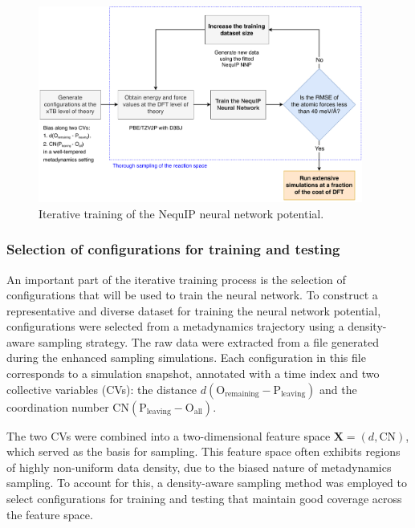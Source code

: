 \begin{figure}[t]
    \centering
    \includegraphics[width=0.95\textwidth]{Figures/3_Computational_details/workflow_diagram_updated.pdf}
    \caption{Iterative training of the NequIP neural network potential.}
    \label{fig:iterative-training}
\end{figure}



\subsubsection{Selection of configurations for training and testing}

An important part of the iterative training process is the selection of configurations that will be used to train the neural network. To construct a representative and diverse dataset for training the neural network potential, configurations were selected from a metadynamics trajectory using a density-aware sampling strategy. The raw data were extracted from a file generated during the enhanced sampling simulations. Each configuration in this file corresponds to a simulation snapshot, annotated with a time index and two collective variables (CVs): the distance $d(\mathrm{O}_\text{remaining} - \mathrm{P}_\text{leaving})$ and the coordination number $\mathrm{CN}(\mathrm{P}_\text{leaving} - \mathrm{O}_\text{all})$.

The two CVs were combined into a two-dimensional feature space $\mathbf{X} = (d, \mathrm{CN})$, which served as the basis for sampling. This feature space often exhibits regions of highly non-uniform data density, due to the biased nature of metadynamics sampling. To account for this, a density-aware sampling method was employed to select configurations for training and testing that maintain good coverage across the feature space.

